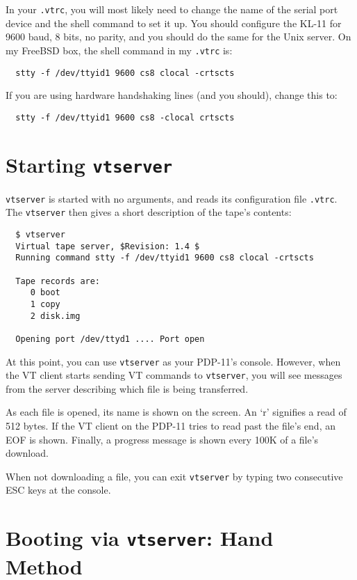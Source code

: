 \medskip

In your {\tt .vtrc}, you will most likely need to change the name of the
serial port device and the shell command to set it up.
You should configure the KL-11 for 9600 baud, 8 bits, no parity, and
you should do the same for the Unix server. On my FreeBSD box, the
shell command in my {\tt .vtrc} is:

\begin{verbatim}
  stty -f /dev/ttyid1 9600 cs8 clocal -crtscts
\end{verbatim}

If you are using hardware handshaking lines (and you should), change this to:

\begin{verbatim}
  stty -f /dev/ttyid1 9600 cs8 -clocal crtscts
\end{verbatim}

\section{Starting {\tt vtserver}}

{\tt vtserver} is started with no arguments, and reads its configuration
file {\tt .vtrc}. The {\tt vtserver} then gives a short description of
the tape's contents:

\begin{verbatim}
  $ vtserver
  Virtual tape server, $Revision: 1.4 $ 
  Running command stty -f /dev/ttyid1 9600 cs8 clocal -crtscts

  Tape records are:
     0 boot
     1 copy
     2 disk.img

  Opening port /dev/ttyd1 .... Port open
\end{verbatim}

At this point, you can use {\tt vtserver} as your PDP-11's console. However,
when the VT client starts sending VT commands to {\tt vtserver}, you will
see messages from the server describing which file is being transferred.

As each file is opened, its name is shown on the screen. An `r' signifies a
read of 512 bytes. If the VT client on the PDP-11 tries to read past the
file's end, an EOF is shown. Finally, a progress message is shown every 100K
of a file's download.

When not downloading a file, you can exit {\tt vtserver} by typing two
consecutive ESC keys at the console.

\section{Booting via {\tt vtserver}: Hand Method}

